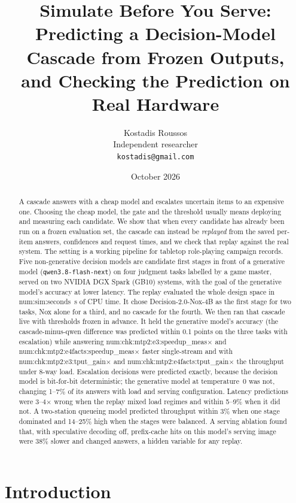 \documentclass[11pt]{article}
\title{Simulate Before You Serve:\\
Predicting a Decision-Model Cascade from Frozen Outputs,\\
and Checking the Prediction on Real Hardware}
\author{Kostadis Roussos\\
Independent researcher\\
\texttt{kostadis@gmail.com}}
\date{October 2026}
\newcommand{\N}[1]{\csname num:#1\endcsname}
\begin{document}
\maketitle

\begin{abstract}
A cascade answers with a cheap model and escalates uncertain items to an expensive one. Choosing the
cheap model, the gate and the threshold usually means deploying and measuring each candidate. We show
that when every candidate has already been run on a frozen evaluation set, the cascade can instead be
\emph{replayed} from the saved per-item answers, confidences and request times, and we check that
replay against the real system. The setting is a working pipeline for tabletop role-playing campaign
records. Five non-generative decision models are candidate first stages in front of a generative model
(\texttt{qwen3.8-flash-next}) on four judgment tasks labelled by a game master, served on two NVIDIA
DGX Spark (GB10) systems, with the goal of the generative model's accuracy at lower latency. The
replay evaluated the whole design space in \N{sim:seconds}~s of CPU time. It chose Decision-2.0-Nox-4B
as the first stage for two tasks, Nox alone for a third, and no cascade for the fourth. We then ran that
cascade live with thresholds frozen in advance. It held the generative model's accuracy (the
cascade-minus-qwen difference was predicted within 0.1 points on the three tasks with escalation)
while answering
\N{chk:mtp2:e3:speedup_meas}$\times$ and \N{chk:mtp2:e4facts:speedup_meas}$\times$ faster
single-stream and with \N{chk:mtp2:e3:tput_gain}$\times$ and \N{chk:mtp2:e4facts:tput_gain}$\times$
the throughput under 8-way load. Escalation decisions were predicted exactly, because the decision
model is bit-for-bit deterministic; the generative model at temperature~0 was not, changing 1--7\% of
its answers with load and serving configuration. Latency predictions were 3--4$\times$ wrong when the
replay mixed load regimes and within 5--9\% when it did not. A two-station queueing model predicted
throughput within 3\% when one stage dominated and 14--25\% high when the stages were balanced. A
serving ablation found that, with speculative decoding off, prefix-cache hits on this model's serving
image were 38\% slower and changed answers, a hidden variable for any replay.
\end{abstract}

\section{Introduction}
\end{document}
